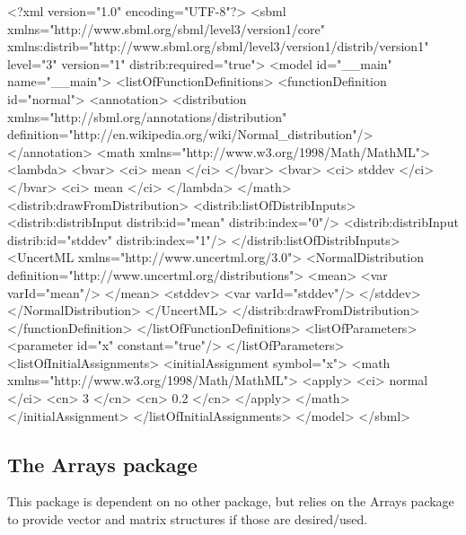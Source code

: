 \documentclass[draftspec]{sbmlpkgspec}
\newcommand{\arrays}{Arrays\xspace}
\begin{document}
\begin{blockChanged}
\begin{example}
<?xml version="1.0" encoding="UTF-8"?>
<sbml xmlns="http://www.sbml.org/sbml/level3/version1/core"
      xmlns:distrib="http://www.sbml.org/sbml/level3/version1/distrib/version1"
      level="3" version="1" distrib:required="true">
  <model id="__main" name="__main">
    <listOfFunctionDefinitions>
      <functionDefinition id="normal">
        <annotation>
          <distribution xmlns="http://sbml.org/annotations/distribution"
                   definition="http://en.wikipedia.org/wiki/Normal_distribution"/>
        </annotation>
        <math xmlns="http://www.w3.org/1998/Math/MathML">
          <lambda>
            <bvar>
              <ci> mean </ci>
            </bvar>
            <bvar>
              <ci> stddev </ci>
            </bvar>
            <ci> mean </ci>
          </lambda>
        </math>
        <distrib:drawFromDistribution>
          <distrib:listOfDistribInputs>
            <distrib:distribInput distrib:id="mean" distrib:index="0"/>
            <distrib:distribInput distrib:id="stddev" distrib:index="1"/>
          </distrib:listOfDistribInputs>
          <UncertML xmlns="http://www.uncertml.org/3.0">
            <NormalDistribution definition="http://www.uncertml.org/distributions">
              <mean>
                <var varId="mean"/>
              </mean>
              <stddev>
                <var varId="stddev"/>
              </stddev>
            </NormalDistribution>
          </UncertML>
        </distrib:drawFromDistribution>
      </functionDefinition>
    </listOfFunctionDefinitions>
    <listOfParameters>
      <parameter id="x" constant="true"/>
    </listOfParameters>
    <listOfInitialAssignments>
      <initialAssignment symbol="x">
        <math xmlns="http://www.w3.org/1998/Math/MathML">
          <apply>
            <ci> normal </ci>
            <cn> 3 </cn>
            <cn> 0.2 </cn>
          </apply>
        </math>
      </initialAssignment>
    </listOfInitialAssignments>
  </model>
</sbml>

\end{example}


\end{blockChanged}

\subsection{The \arrays package}
This package is dependent on no other package, but relies on the \arrays package
to provide vector and matrix structures if those are desired/used.
\end{document}
